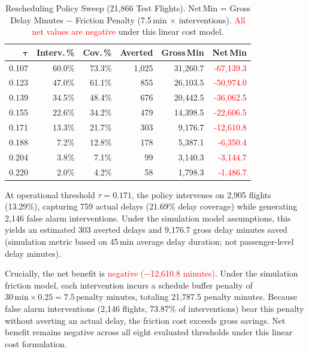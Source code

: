 \documentclass[conference]{IEEEtran}
\begin{document}
\begin{table}[!ht]
\renewcommand{\arraystretch}{1.1}
\caption{Rescheduling Policy Sweep (21,866 Test Flights). Net\,Min = Gross Delay Minutes $-$ Friction Penalty (7.5\,min $\times$ interventions). \textcolor{red}{All net values are negative} under this linear cost model.}
\label{tab:resched}
\centering
\setlength{\tabcolsep}{3.5pt}
\small
\begin{tabular}{@{}r r r r r r@{}}
\toprule
$\boldsymbol{\tau}$ &
  \textbf{Interv.\,\%} &
  \textbf{Cov.\,\%} &
  \textbf{Averted} &
  \textbf{Gross\,Min} &
  \textbf{Net\,Min} \\
\midrule
\mbox{0.107} & \mbox{60.0}\% & \mbox{73.3}\% & \mbox{1,025} & \mbox{31,260.7} & \textcolor{red}{\mbox{-67,139.3}} \\
\mbox{0.123} & \mbox{47.0}\% & \mbox{61.1}\% & \mbox{855} & \mbox{26,103.5} & \textcolor{red}{\mbox{-50,974.0}} \\
\mbox{0.139} & \mbox{34.5}\% & \mbox{48.4}\% & \mbox{676} & \mbox{20,442.5} & \textcolor{red}{\mbox{-36,062.5}} \\
\mbox{0.155} & \mbox{22.6}\% & \mbox{34.2}\% & \mbox{479} & \mbox{14,398.5} & \textcolor{red}{\mbox{-22,606.5}} \\
\mbox{0.171} & \mbox{13.3}\% & \mbox{21.7}\% & \mbox{303} & \mbox{9,176.7} & \textcolor{red}{\mbox{-12,610.8}} \\
\mbox{0.188} & \mbox{7.2}\% & \mbox{12.8}\% & \mbox{178} & \mbox{5,387.1} & \textcolor{red}{\mbox{-6,350.4}} \\
\mbox{0.204} & \mbox{3.8}\% & \mbox{7.1}\% & \mbox{99} & \mbox{3,140.3} & \textcolor{red}{\mbox{-3,144.7}} \\
\mbox{0.220} & \mbox{2.0}\% & \mbox{4.2}\% & \mbox{58} & \mbox{1,798.3} & \textcolor{red}{\mbox{-1,486.7}} \\
\bottomrule
\end{tabular}
\end{table}

At operational threshold $\tau = 0.171$, the policy intervenes on \mbox{2,905} flights (\mbox{13.29\%}), capturing \mbox{759} actual delays (\mbox{21.69\%} delay coverage) while generating \mbox{2,146} false alarm interventions. Under the simulation model assumptions, this yields an estimated \mbox{303} averted delays and \mbox{9,176.7} gross delay minutes saved (simulation metric based on 45\,min average delay duration; not passenger-level delay minutes).

Crucially, the net benefit is \textcolor{red}{negative (\mbox{$-$12,610.8} minutes)}. Under the simulation friction model, each intervention incurs a schedule buffer penalty of $30\,\text{min} \times 0.25 = 7.5\,\text{penalty minutes}$, totaling \mbox{21,787.5} penalty minutes. Because false alarm interventions (\mbox{2,146} flights, \mbox{73.87\%} of interventions) bear this penalty without averting an actual delay, the friction cost exceeds gross savings. Net benefit remains negative across all eight evaluated thresholds under this linear cost formulation.
\end{document}
